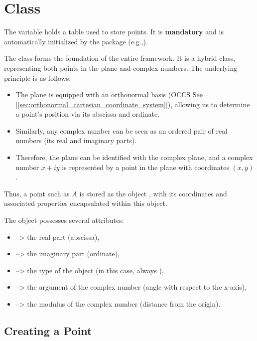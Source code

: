 \newpage

\section{Class }

The variable  holds a table used to store points. It is \textbf{mandatory} and is automatically initialized by the package (e.g.,).


\vspace{1em}
The  class forms the foundation of the entire framework. It is a hybrid class, representing both points in the plane and complex numbers. The underlying principle is as follows:

\begin{itemize}
  \item The plane is equipped with an orthonormal basis (OCCS See [\ref{sec:orthonormal_cartesian_coordinate_system}]), allowing us to determine a point's position via its abscissa and ordinate.
  \item Similarly, any complex number can be seen as an ordered pair of real numbers (its real and imaginary parts).
  \item Therefore, the plane can be identified with the complex plane, and a complex number $x + iy$ is represented by a point in the plane with coordinates $(x, y)$.
\end{itemize}

Thus, a point such as $A$ is stored as the object , with its coordinates and associated properties encapsulated within this object.

\vspace{1em}
The  object possesses several attributes:
\begin{itemize}
  \item {} --> the real part (abscissa),
  \item {} --> the imaginary part (ordinate),
  \item {} --> the type of the object (in this case, always ),
  \item {} --> the argument of the complex number (angle with respect to the x-axis),
  \item {} --> the modulus of the complex number (distance from the origin).
\end{itemize}



\subsection{Creating a Point}
\label{sub:creating_a_point}

